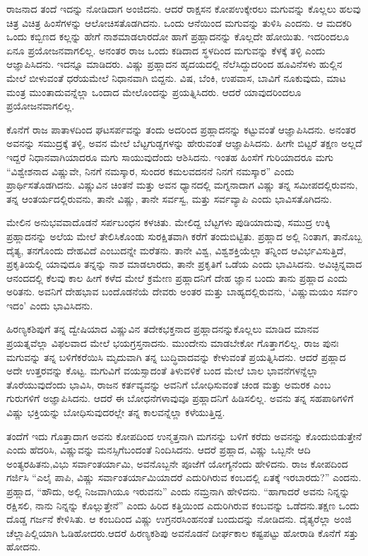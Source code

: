 \vskip 0.3cm

ರಾಜನಾದ ತಂದೆ ಇದನ್ನು ನೋಡಿದಾಗ ಅಂಜಿದನು. ಆದರೆ ರಾಕ್ಷಸನ ಕೋಪ\break ಉಕ್ಕೇರಲು ಮಗುವನ್ನು ಕೊಲ್ಲಲು ಹಲವು ಚಿತ್ರ ವಿಚಿತ್ರ ಹಿಂಸೆಗಳನ್ನು ಆಲೋಚಿಸತೊಡಗಿದನು. ಒಂದು ಆನೆಯಿಂದ ಮಗುವನ್ನು ತುಳಿಸಿ ಎಂದನು. ಆ ಮದಕರಿ ಒಂದು ಕಬ್ಬಿಣದ ಕಲ್ಲನ್ನು ಹೇಗೆ ನಾಶಮಾಡಲಾರದೋ ಹಾಗೆ ಪ್ರಹ್ಲಾದನನ್ನು ಕೊಲ್ಲದೇ ಹೋಯಿತು. ಇದರಿಂದಲೂ ಏನೂ ಪ್ರಯೋಜನವಾಗಲಿಲ್ಲ. ಅನಂತರ ರಾಜ ಒಂದು ಕಡಿದಾದ ಸ್ಥಳದಿಂದ ಮಗುವನ್ನು ಕೆಳಕ್ಕೆ ತಳ್ಳಿ ಎಂದು ಆಜ್ಞಾಪಿಸಿದನು. ಇದನ್ನೂ ಮಾಡಿದರು. ವಿಷ್ಣು ಪ್ರಹ್ಲಾದನ ಹೃದಯದಲ್ಲಿ ನೆಲೆಸಿದ್ದುದರಿಂದ ಹೂವಿನೆಸಳು ಹುಲ್ಲಿನ ಮೇಲೆ ಬೀಳುವಂತೆ ಧರೆಯಮೇಲೆ ನಿಧಾನವಾಗಿ ಬಿದ್ದನು. ವಿಷ, ಬೆಂಕಿ, ಉಪವಾಸ, ಬಾವಿಗೆ ನೂಕುವುದು, ಮಾಟ ಮಂತ್ರ ಮುಂತಾದುವನ್ನೆಲ್ಲಾ ಒಂದಾದ ಮೇಲೊಂದನ್ನು ಪ್ರಯತ್ನಿಸಿದರು. ಆದರೆ ಯಾವುದ\-ರಿಂದಲೂ ಪ್ರಯೋಜನವಾಗಲಿಲ್ಲ.

\vskip 0.3cm

ಕೊನೆಗೆ ರಾಜ ಪಾತಾಳದಿಂದ ಘಟಸರ್ಪವನ್ನು ತಂದು ಅದರಿಂದ ಪ್ರಹ್ಲಾದನನ್ನು ಕಟ್ಟುವಂತೆ ಆಜ್ಞಾಪಿಸಿದನು. ಅನಂತರ ಅವನನ್ನು ಸಮುದ್ರಕ್ಕೆ ತಳ್ಳಿ, ಅವನ ಮೇಲೆ ಬೆಟ್ಟಗುಡ್ಡಗಳನ್ನು ಹೇರುವಂತೆ ಆಜ್ಞಾಪಿಸಿದನು. ಹೀಗೇ ಬಿಟ್ಟರೆ ತಕ್ಷಣ ಅಲ್ಲದೆ ಇದ್ದರೆ ನಿಧಾನವಾಗಿಯಾದರೂ ಮಗು ಸಾಯುವುದೆಂದು ಆಶಿಸಿದನು. ಇಂತಹ ಹಿಂಸೆಗೆ ಗುರಿಯಾದರೂ ಮಗು “ವಿಶ್ವೇಶನಾದ ವಿಷ್ಣುವೇ, ನಿನಗೆ ನಮಸ್ಕಾರ, ಸುಂದರ ಕಮಲವದನನೆ ನಿನಗೆ ನಮಸ್ಕಾರ” ಎಂದು ಪ್ರಾರ್ಥಿಸತೊಡಗಿದನು. ವಿಷ್ಣುವಿನ ಚಿಂತನೆ ಮತ್ತು ಅವನ ಧ್ಯಾನದಲ್ಲಿ ಮಗ್ನನಾದಾಗ ವಿಷ್ಣು ತನ್ನ ಸಮೀಪದಲ್ಲಿರುವನು, ತನ್ನ ಆಂತರ್ಯದಲ್ಲಿರುವನು, ತಾನೇ ವಿಷ್ಣು, ತಾನೇ ಸರ್ವಸ್ವ, ಮತ್ತು ಸರ್ವವ್ಯಾಪಿ ಎಂದು ಭಾವಿಸತೊಗಿದನು.

ಮೇಲಿನ ಅನುಭವವಾದೊಡನೆ ಸರ್ಪಬಂಧನ ಕಳಚಿತು. ಮೇಲಿದ್ದ ಬೆಟ್ಟಗಳು ಪುಡಿ\-ಯಾದುವು, ಸಮುದ್ರ ಉಕ್ಕಿ ಪ್ರಹ್ಲಾದನನ್ನು ಅಲೆಯ ಮೇಲೆ ತೇಲಿಸಿಕೊಂಡು ಸುರಕ್ಷಿತವಾಗಿ ಕರೆಗೆ ತಂದುಬಿಟ್ಟಿತು. ಪ್ರಹ್ಲಾದ ಅಲ್ಲಿ ನಿಂತಾಗ, ತಾನೊಬ್ಬ ದೈತ್ಯ, ತನಗೊಂದು ದೇಹವಿದೆ ಎಂಬುದನ್ನೇ ಮರೆತನು. ತಾನೇ ವಿಶ್ವ, ವಿಶ್ವಶಕ್ತಿಯೆಲ್ಲಾ ತನ್ನಿಂದ ಆವಿರ್ಭವಿಸುತ್ತಿದೆ, ಪ್ರಕೃತಿಯಲ್ಲಿ ಯಾವುದೂ ತನ್ನನ್ನು ನಾಶ ಮಾಡಲಾರದು, ತಾನೇ ಪ್ರಕೃತಿಗೆ ಒಡೆಯ ಎಂದು ಭಾವಿಸಿದನು. ಅವಿಚ್ಛಿನ್ನವಾದ ಆನಂದದಲ್ಲಿ ಕೆಲವು ಕಾಲ ಹೀಗೆ ಕಳೆದ ಮೇಲೆ ಕ್ರಮೇಣ ಪ್ರಹ್ಲಾದನಿಗೆ ದೇಹ ಜ್ಞಾನ ಬಂದು ತಾನು ಪ್ರಹ್ಲಾದ ಎಂದು ಅರಿತನು. ಅವನಿಗೆ ದೇಹಭಾವ ಬಂದೊಡನೆಯೆ ದೇವರು ಅಂತರ ಮತ್ತು ಬಾಹ್ಯದಲ್ಲಿರುವನು, ‘ವಿಷ್ಣುಮಯಂ ಸರ್ವಂ ಇದಂ’ ಎಂದು ಭಾವಿಸಿದನು.

ಹಿರಣ್ಯಕಶಿಪುಗೆ ತನ್ನ ದ್ವೇಷಿಯಾದ ವಿಷ್ಣುವಿನ ತದೇಕಭಕ್ತನಾದ ಪ್ರಹ್ಲಾದನನ್ನು\break ಕೊಲ್ಲಲು ಮಾಡಿದ ಮಾನವ ಪ್ರಯತ್ನವೆಲ್ಲಾ ವಿಫಲವಾದ ಮೇಲೆ ಭಯಗ್ರಸ್ತನಾದನು. ಮುಂದೇನು ಮಾಡಬೇಕೋ ಗೊತ್ತಾಗಲಿಲ್ಲ. ರಾಜ ಪುನಃ ಮಗುವನ್ನು ತನ್ನ ಬಳಿಗೆ\break ಕರೆಯಿಸಿ ಮೃದುವಾಗಿ ತನ್ನ ಬುದ್ಧಿವಾದವನ್ನು ಕೇಳುವಂತೆ ಪ್ರಯತ್ನಿಸಿದನು. ಆದರೆ ಪ್ರಹ್ಲಾದ ಅದೇ ಉತ್ತರವನ್ನು ಕೊಟ್ಟ. ಮಗುವಿಗೆ ವಯಸ್ಸಾದಂತೆ ತಿಳುವಳಿಕೆ ಬಂದ ಮೇಲೆ ಬಾಲ ಭಾವನೆಗಳನ್ನೆಲ್ಲಾ ತೊರೆಯುವುದೆಂದು ಭಾವಿಸಿ, ರಾಜನ ಕರ್ತವ್ಯವನ್ನು ಅವನಿಗೆ ಬೋಧಿಸುವಂತೆ ಚಂಡ ಮತ್ತು ಅಮರಕ ಎಂಬ ಗುರುಗಳಿಗೆ ಅಜ್ಞಾಪಿಸಿದನು. ಆದರೆ ಈ ಬೋಧನೆಗಳಾವುವೂ ಪ್ರಹ್ಲಾದನಿಗೆ ಹಿಡಿಸಲಿಲ್ಲ. ಅವನು ತನ್ನ ಸಹಪಾಠಿಗಳಿಗೆ ವಿಷ್ಣು ಭಕ್ತಿಯನ್ನು ಬೋಧಿಸುವುದರಲ್ಲೇ ತನ್ನ ಕಾಲವನ್ನೆಲ್ಲಾ ಕಳೆಯುತ್ತಿದ್ದ.

ತಂದೆಗೆ ಇದು ಗೊತ್ತಾದಾಗ ಅವನು ಕೋಪದಿಂದ ಉನ್ಮತ್ತನಾಗಿ ಮಗನನ್ನು ಬಳಿಗೆ ಕರೆದು ಅವನನ್ನು ಕೊಂದುಬಿಡುತ್ತೇನೆ ಎಂದು ಹೆದರಿಸಿ, ವಿಷ್ಣುವನ್ನು ಮನಸ್ಸಿಗೆ\break ಬಂದಂತೆ ನಿಂದಿಸಿದನು. ಆದರೆ ಪ್ರಹ್ಲಾದ, ವಿಷ್ಣು ಒಬ್ಬನೇ ಆದಿ ಅಂತ್ಯರಹಿತನು,\break ವಿಭು ಸರ್ವಾಂತರ್ಯಾಮಿ, ಅವನೊಬ್ಬನೇ ಪೂಜೆಗೆ ಯೋಗ್ಯನೆಂದು ಹೇಳಿದನು. ರಾಜ ಕೋಪದಿಂದ ಗರ್ಜಿಸಿ “ಎಲೈ ಪಾಪಿ, ವಿಷ್ಣು ಸರ್ವಾಂತರ್ಯಾಮಿಯಾದರೆ ಎದುರಿಗಿರುವ ಕಂಬದಲ್ಲಿ ಏತಕ್ಕೆ ಇರಬಾರದು?” ಎಂದನು. ಪ್ರಹ್ಲಾದ, “ಹೌದು, ಅಲ್ಲಿ ನಿಜವಾಗಿಯೂ ಇರುವನು” ಎಂದು ನಮ್ರನಾಗಿ ಹೇಳಿದನು. “ಹಾಗಾದರೆ ಅವನು ನಿನ್ನನ್ನು ರಕ್ಷಿಸಲಿ, ನಾನು ನಿನ್ನನ್ನು ಕೊಲ್ಲುತ್ತೇನೆ” ಎಂದು ಹಿರಿದ ಕತ್ತಿಯಿಂದ ಎದುರಿಗಿರುವ ಕಂಬವನ್ನು ಒಡೆದನು.\break ತಕ್ಷಣ ಒಂದು ದೊಡ್ಡ ಗರ್ಜನೆ ಕೇಳಿಸಿತು. ಆ ಕಂಬದಿಂದ ವಿಷ್ಣು ಉಗ್ರನರಸಿಂಹನಂತೆ ಬಂದುದನ್ನು ನೋಡಿದನು. ದೈತ್ಯರೆಲ್ಲಾ ಅಂಜಿ ಚೆಲ್ಲಾಪಿಲ್ಲಿಯಾಗಿ ಓಡಿಹೋದರು.\break ಆದರೆ ಹಿರಣ್ಯಕಶಿಪು ಅವನೊಡನೆ ದೀರ್ಘಕಾಲ ಕಷ್ಟಪಟ್ಟು ಹೋರಾಡಿ ಕೊನೆಗೆ ಸತ್ತು ಹೋದನು.

